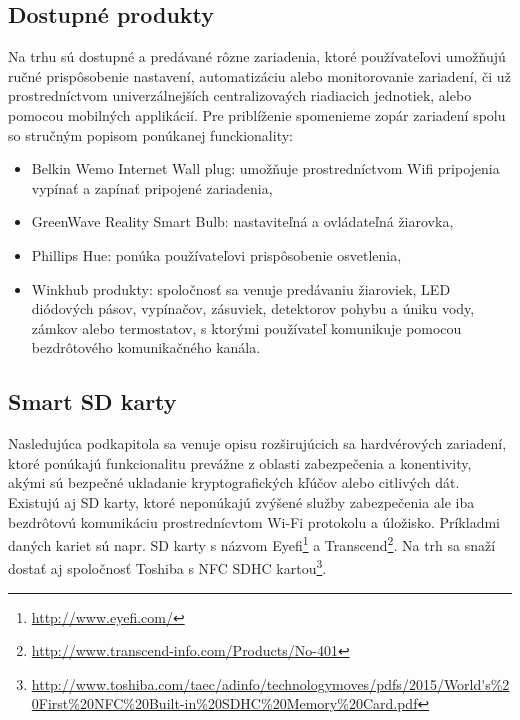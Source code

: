 \documentclass[12pt,a4wide,oneside,openright]{report}
\begin{document}
\subsection{Dostupné produkty} \label{s_devices}
Na trhu sú dostupné a predávané rôzne zariadenia, ktoré používateľovi umožňujú ručné prispôsobenie nastavení, automatizáciu alebo monitorovanie zariadení, či už prostredníctvom univerzálnejších centralizovaých riadiacich jednotiek, alebo pomocou mobilných applikácií.
Pre priblíženie spomenieme zopár zariadení spolu so stručným popisom ponúkanej funckionality:
\begin{itemize}
	\item Belkin Wemo Internet Wall plug: umožňuje prostredníctvom Wifi pripojenia vypínať a zapínať pripojené zariadenia,
	\item GreenWave Reality Smart Bulb: nastaviteľná a ovládateľná žiarovka,
	\item Phillips Hue: ponúka používateľovi prispôsobenie osvetlenia,
	\item Winkhub produkty: spoločnosť sa venuje predávaniu žiaroviek, LED diódových pásov, vypínačov, zásuviek, detektorov pohybu a úniku vody, zámkov alebo termostatov, s ktorými používateľ komunikuje pomocou bezdrôtového komunikačného kanála.
\end{itemize}
\onehalfspacing


\subsection{Smart SD karty}
Nasledujúca podkapitola sa venuje opisu rozširujúcich sa hardvérových zariadení, ktoré ponúkajú funkcionalitu prevážne z oblasti zabezpečenia a konentivity, akými sú bezpečné ukladanie kryptografických kľúčov alebo citlivých dát.
Existujú aj SD karty, ktoré neponúkajú zvýšené služby zabezpečenia ale iba bezdrôtovú komunikáciu prostrednícvtom Wi-Fi protokolu a úložisko. Príkladmi daných kariet sú napr. SD karty s názvom Eyefi\footnote{\url{http://www.eyefi.com/}} a Transcend\footnote{\url{http://www.transcend-info.com/Products/No-401}}. Na trh sa snaží dostať aj spoločnosť Toshiba s NFC SDHC  kartou\footnote{\url{http://www.toshiba.com/taec/adinfo/technologymoves/pdfs/2015/World's\%20First\%20NFC\%20Built-in\%20SDHC\%20Memory\%20Card.pdf}}.
\end{document}
